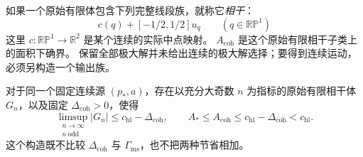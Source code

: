 如果一个原始有限体包含下列完整线段族，就称它\emph{相干}：
\[
 c(q)+[-1/2,1/2]u_q\qquad(q\in\mathbb {RP}^1)
\]
这里 $c:\mathbb {RP}^1\to\mathbb R^2$ 是某个连续的实际中点映射。
$A_{\mathrm{coh}}$ 是这个原始有限相干子类上的面积下确界。
保留全部极大解并未给出连续的极大解选择；要得到连续运动，必须另构造一个输出族。

\begin{proposition}[相干的正面积节省]\label{prop:upper-coherent}
对于同一个固定连续源 $(p_*,a)$，存在以充分大奇数 $n$ 为指标的原始有限相干体 $G_n$，以及固定 $\Delta_{\mathrm{coh}}>0$，使得
\[
 \limsup_{\substack{n\to\infty\\n\ \mathrm{odd}}}|G_n|
       \le c_{\mathrm{hl}}-\Delta_{\mathrm{coh}},\qquad
 A_*\le A_{\mathrm{coh}}\le c_{\mathrm{hl}}-\Delta_{\mathrm{coh}}<c_{\mathrm{hl}}.
\]
这个构造既不比较 $\Delta_{\mathrm{coh}}$ 与 $\Gamma_{\mathrm{ms}}$，也不把两种节省相加。
\end{proposition}

